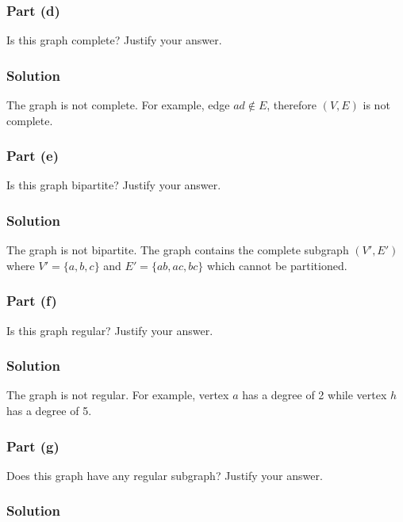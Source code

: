 \documentclass[12pt]{article}
\begin{document}
\pagebreak
\subsubsection*{Part (d)}

Is this graph complete? Justify your answer.

\subsubsection*{Solution}

The graph is not complete. For example, edge $ad \notin E$, therefore $(V, E)$ is not complete.

\subsubsection*{Part (e)}

Is this graph bipartite? Justify your answer.

\subsubsection*{Solution}

The graph is not bipartite. The graph contains the complete subgraph $(V', E')$ where $V' = \{ a, b, c \}$ and $E' = \{ ab, ac, bc \}$ which cannot be partitioned.

\subsubsection*{Part (f)}

Is this graph regular? Justify your answer.

\subsubsection*{Solution}

The graph is not regular. For example, vertex $a$ has a degree of 2 while vertex $h$ has a degree of 5.

\subsubsection*{Part (g)}

Does this graph have any regular subgraph? Justify your answer.

\subsubsection*{Solution}
\end{document}
